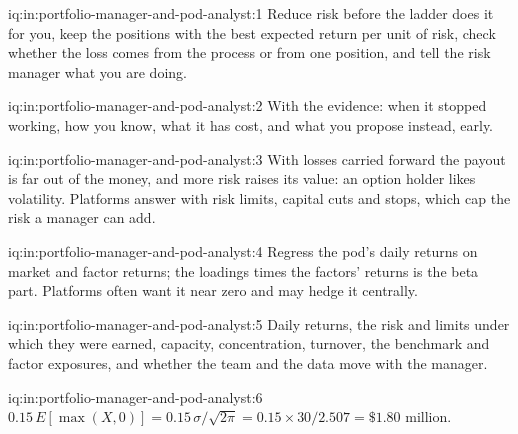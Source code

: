 \begin{solution}{iq:in:portfolio-manager-and-pod-analyst:1}
Reduce risk before the ladder does it for you, keep the positions with the best expected return per unit of risk, check
whether the loss comes from the process or from one position, and tell the risk manager what you are doing.
\end{solution}

\begin{solution}{iq:in:portfolio-manager-and-pod-analyst:2}
With the evidence: when it stopped working, how you know, what it has cost, and what you propose instead, early.
\end{solution}

\begin{solution}{iq:in:portfolio-manager-and-pod-analyst:3}
With losses carried forward the payout is far out of the money, and more risk raises its value: an option holder likes
volatility. Platforms answer with risk limits, capital cuts and stops, which cap the risk a manager can add.
\end{solution}

\begin{solution}{iq:in:portfolio-manager-and-pod-analyst:4}
Regress the pod's daily returns on market and factor returns; the loadings times the factors' returns is the beta part.
Platforms often want it near zero and may hedge it centrally.
\end{solution}

\begin{solution}{iq:in:portfolio-manager-and-pod-analyst:5}
Daily returns, the risk and limits under which they were earned, capacity, concentration, turnover, the benchmark and
factor exposures, and whether the team and the data move with the manager.
\end{solution}

\begin{solution}{iq:in:portfolio-manager-and-pod-analyst:6}
$0.15\,E[\max(X,0)]=0.15\,\sigma/\sqrt{2\pi}=0.15\times30/2.507=\$1.80$ million.
\end{solution}
